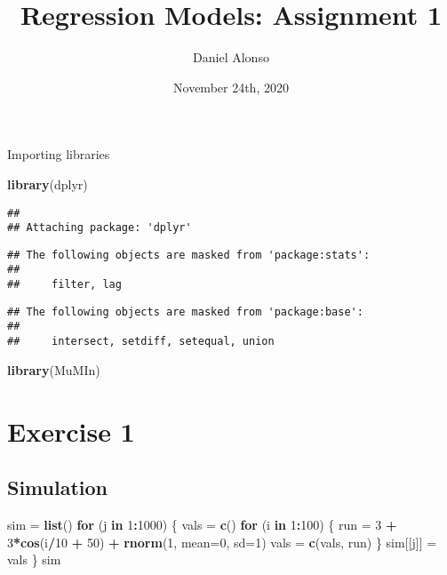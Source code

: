 \documentclass[]{article}
\title{Regression Models: Assignment 1}
\author{Daniel Alonso}
\date{November 24th, 2020}
\newenvironment{Shaded}{\begin{snugshade}}{\end{snugshade}}
\newcommand{\ControlFlowTok}[1]{\textcolor[rgb]{0.13,0.29,0.53}{\textbf{#1}}}
\newcommand{\DataTypeTok}[1]{\textcolor[rgb]{0.13,0.29,0.53}{#1}}
\newcommand{\DecValTok}[1]{\textcolor[rgb]{0.00,0.00,0.81}{#1}}
\newcommand{\KeywordTok}[1]{\textcolor[rgb]{0.13,0.29,0.53}{\textbf{#1}}}
\newcommand{\NormalTok}[1]{#1}
\newcommand{\OperatorTok}[1]{\textcolor[rgb]{0.81,0.36,0.00}{\textbf{#1}}}
\newcommand{\StringTok}[1]{\textcolor[rgb]{0.31,0.60,0.02}{#1}}
\begin{document}
\maketitle

Importing libraries

\begin{Shaded}
\begin{Highlighting}[]
\KeywordTok{library}\NormalTok{(dplyr)}
\end{Highlighting}
\end{Shaded}

\begin{verbatim}
## 
## Attaching package: 'dplyr'
\end{verbatim}

\begin{verbatim}
## The following objects are masked from 'package:stats':
## 
##     filter, lag
\end{verbatim}

\begin{verbatim}
## The following objects are masked from 'package:base':
## 
##     intersect, setdiff, setequal, union
\end{verbatim}

\begin{Shaded}
\begin{Highlighting}[]
\KeywordTok{library}\NormalTok{(MuMIn)}
\end{Highlighting}
\end{Shaded}

\hypertarget{exercise-1}{%
\section{Exercise 1}\label{exercise-1}}

\hypertarget{simulation}{%
\subsection{Simulation}\label{simulation}}

\begin{Shaded}
\begin{Highlighting}[]
\NormalTok{sim =}\StringTok{ }\KeywordTok{list}\NormalTok{()}
\ControlFlowTok{for}\NormalTok{ (j }\ControlFlowTok{in} \DecValTok{1}\OperatorTok{:}\DecValTok{1000}\NormalTok{) \{}
\NormalTok{    vals =}\StringTok{ }\KeywordTok{c}\NormalTok{()}
    \ControlFlowTok{for}\NormalTok{ (i }\ControlFlowTok{in} \DecValTok{1}\OperatorTok{:}\DecValTok{100}\NormalTok{) \{}
\NormalTok{        run =}\StringTok{ }\DecValTok{3} \OperatorTok{+}\StringTok{ }\DecValTok{3}\OperatorTok{*}\KeywordTok{cos}\NormalTok{(i}\OperatorTok{/}\DecValTok{10} \OperatorTok{+}\StringTok{ }\DecValTok{50}\NormalTok{) }\OperatorTok{+}\StringTok{ }\KeywordTok{rnorm}\NormalTok{(}\DecValTok{1}\NormalTok{, }\DataTypeTok{mean=}\DecValTok{0}\NormalTok{, }\DataTypeTok{sd=}\DecValTok{1}\NormalTok{)}
\NormalTok{        vals =}\StringTok{ }\KeywordTok{c}\NormalTok{(vals, run)}
\NormalTok{    \}}
\NormalTok{    sim[[j]] =}\StringTok{ }\NormalTok{vals}
\NormalTok{\}}
\NormalTok{sim}
\end{Highlighting}
\end{Shaded}
\end{document}
